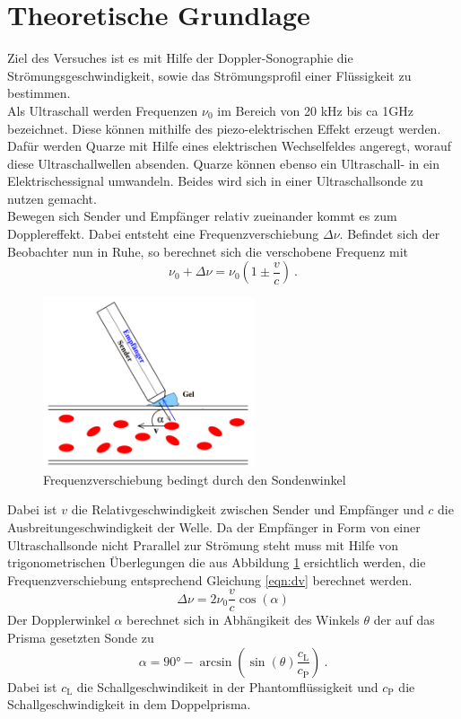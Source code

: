\section{Theoretische Grundlage}
\label{sec:Theorie}
Ziel des Versuches ist es mit Hilfe der Doppler-Sonographie die Strömungsgeschwindigkeit, sowie das Strömungsprofil einer Flüssigkeit zu bestimmen. \\
Als Ultraschall werden Frequenzen $\nu_0$ im Bereich von 20 kHz bis ca 1GHz bezeichnet. Diese können mithilfe des piezo-elektrischen Effekt erzeugt werden. Dafür werden Quarze mit Hilfe eines elektrischen Wechselfeldes angeregt, worauf diese Ultraschallwellen absenden. Quarze können ebenso ein Ultraschall- in ein Elektrischessignal umwandeln. Beides wird sich in einer Ultraschallsonde zu nutzen gemacht.	\\
Bewegen sich Sender und Empfänger relativ zueinander kommt es zum Dopplereffekt. Dabei entsteht eine Frequenzverschiebung $\Delta \nu$. Befindet sich der Beobachter nun in Ruhe, so berechnet sich die verschobene Frequenz mit
\begin{equation}
  \nu_0 + \Delta \nu = \nu_0 \left( 1 \pm \frac{v}{c} \right) \ .
  \label{}
\end{equation}
\begin{figure}
  \centering
  \includegraphics[height=5cm]{picture/Doppler.pdf}
  \caption{Frequenzverschiebung bedingt durch den Sondenwinkel}
  \label{fig:dFre}
\end{figure}
Dabei ist $v$ die Relativgeschwindigkeit zwischen Sender und Empfänger und $c$ die Ausbreitungeschwindigkeit der Welle. Da der Empfänger in Form von einer Ultraschallsonde nicht Prarallel zur Strömung steht muss mit Hilfe von trigonometrischen Überlegungen die aus Abbildung \ref{fig:dFre} ersichtlich werden, die Frequenzverschiebung entsprechend Gleichung \eqref{eqn:dv} berechnet werden.
\begin{equation}
  \Delta \nu = 2 \nu_0 \frac{v}{c} \cos (\alpha)
  \label{eqn:dv}
\end{equation}
Der Dopplerwinkel $\alpha$ berechnet sich in Abhängikeit des Winkels $\theta$ der auf das Prisma gesetzten Sonde zu
\begin{equation}
  \alpha = 90° - \arcsin\left( \sin(\theta) \frac{c_\text{L}}{c_\text{P}} \right) \ .
  \label{eqn:alpha}
\end{equation}
Dabei ist $c_\text{L}$ die Schallgeschwindikeit in der Phantomflüssigkeit und $c_\text{P}$ die Schallgeschwindigkeit in dem Doppelprisma.
